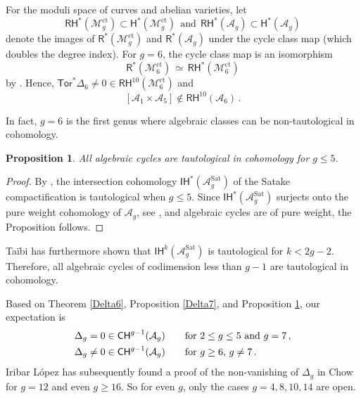 \documentclass[11pt]{amsart}
\newtheorem{thm}{Theorem}
\newtheorem{prop}[thm]{Proposition}
\theoremstyle{definition}
\newcommand{\M}{\mathcal{M}}
\newcommand{\A}{\mathcal{A}}
\renewcommand{\H}{\mathsf{H}}
\DeclareMathOperator{\ct}{ct}
\newcommand{\Tor}{\mathsf{Tor}}
\begin{document}
For the moduli space of
curves and
abelian varieties, let 
$$
\mathsf{RH}^*(\M_g^{\ct}) \subset \mathsf{H}^*(\M_g^{\ct})\ \ \text{and} \ \ 
\mathsf{RH}^*(\A_g) \subset \mathsf{H}^*(\A_g)$$ denote the
images of 
$\mathsf{R}^*(\M_g^{\ct})$ 
and
$\mathsf{R}^*(\A_g)$
under the cycle class map (which doubles
the degree index).   
For $g=6$, the
cycle class map is an isomorphism
$$\mathsf{R}^*(\M_6^{\ct})\,  \simeq
\, \mathsf{RH}^*(\M_6^{\ct})$$
by \cite{CLS}. Hence,
$\Tor^*\Delta_6\neq 0\in  
\mathsf{RH}^{10}(\M_6^{\ct})$ and
    $$[\A_1\times \A_5]\notin \mathsf{RH}^{10}(\A_6)\, .$$




In fact, $g=6$ is the first genus where algebraic classes can
be non-tautological in cohomology.
\begin{prop}\label{algcyclee}
All algebraic cycles are tautological in cohomology for $g\leq 5$.     
\end{prop}
\begin{proof} By \cite[Theorem 17, Theorem 32]{HT2}, the intersection cohomology $\mathsf{IH}^*(\A_g^{\mathrm{Sat}})$ of the Satake compactification is tautological when $g\leq 5$. Since $\mathsf{IH}^*(\A_g^{\mathrm{Sat}})$ surjects onto the pure weight cohomology of $\A_g$, see \cite[Lemma 2]{Durfee}, and algebraic cycles are of pure weight, the Proposition follows.\end{proof}
Taïbi \cite[Theorem 33]{HT2} has furthermore shown that $\mathsf{IH}^k(\A_g^{\mathrm{Sat}})$ is tautological for $k<2g-2$. Therefore, all algebraic cycles of codimension less than $g-1$ are tautological in cohomology. 

 Based on Theorem \ref{Delta6},
 Proposition \ref{Delta7}, and Proposition \ref{algcyclee}, our expectation is
 \begin{align*}
\Delta_g = 0 \in \mathsf{CH}^{g-1}(\A_g) & \text{\qquad for $2\leq g\leq 5$ and $g=7$\,,}\\
\Delta_g \neq 0 \in \mathsf{CH}^{g-1}(\A_g) & \text{\qquad for $g\geq 6$, $g\neq 7$}\,.
\end{align*}
Iribar L\'opez \cite{Iribar} has 
subsequently
found
a proof of the non-vanishing 
of $\Delta_g$ in
Chow for $g=12$ and even $g\geq 16$.
So for even $g$, only the cases
$g=4,8,10,14$  are open.
\end{document}
